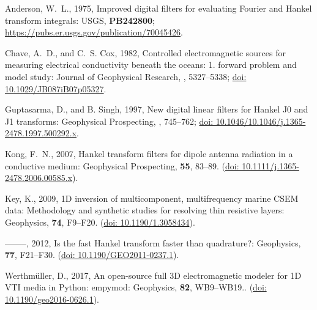 \documentclass[fontsize=9pt, parskip=half, notitlepage, fleqn]{scrartcl}
\begin{document}
\begin{thebibliography}{}
\itemsep0pt

Anderson, W.~L.,  1975, Improved digital filters for evaluating {F}ourier and
  {H}ankel transform integrals:
\newblock USGS, {\bf PB242800};
  \href{https://pubs.er.usgs.gov/publication/70045426}{https://pubs.er.usgs.gov/publication/70045426}.

Chave, A.~D., and C.~S. Cox,  1982, Controlled electromagnetic sources for
  measuring electrical conductivity beneath the oceans: 1. forward problem and
  model study: Journal of Geophysical Research,
, 5327--5338;
  \href{http://doi.org/10.1029/JB087iB07p05327}{doi: 10.1029/JB087iB07p05327}.

Guptasarma, D., and B. Singh,  1997, New digital linear filters for {H}ankel
  {J}0 and {J}1 transforms: Geophysical Prospecting,
, 745--762;
  \href{http://doi.org/10.1046/j.1365-2478.1997.500292.x}{doi:
  10.1046/10.1046/j.1365-2478.1997.500292.x}.

Kong, F.~N.,  2007, Hankel transform filters for dipole antenna radiation in a
  conductive medium: Geophysical Prospecting, {\bf 55}, 83--89.
\newblock (\href{http://doi.org/10.1111/j.1365-2478.2006.00585.x}{doi:
  10.1111/j.1365-2478.2006.00585.x}).

Key, K.,  2009, {1D} inversion of multicomponent, multifrequency marine {CSEM}
  data: {M}ethodology and synthetic studies for resolving thin resistive
  layers: Geophysics, {\bf 74}, F9--F20.
\newblock (\href{http://doi.org/10.1190/1.3058434}{doi: 10.1190/1.3058434}).

--------, 2012, Is the fast {H}ankel transform faster than quadrature?:
  Geophysics, {\bf 77}, F21--F30.
\newblock (\href{http://doi.org/10.1190/GEO2011-0237.1}{doi:
  10.1190/GEO2011-0237.1}).

Werthmüller, D.,  2017, An open-source full {3D} electromagnetic modeler for
  {1D} {VTI} media in {P}ython: empymod: Geophysics, {\bf 82}, WB9--WB19..
\newblock (\href{http://doi.org/10.1190/geo2016-0626.1}{doi:
  10.1190/geo2016-0626.1}).


\end{thebibliography}
\end{document}
